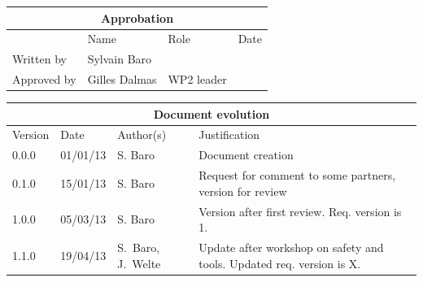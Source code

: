 \documentclass{template/openetcs_article}
\begin{document}
\begin{tabular}{|p{2.2cm}|p{4cm}|p{4cm}|p{2cm}|}
\hline
\multicolumn{4}{|c|}{Approbation} \\
\hline
  &  Name & Role & Date   \\
\hline  
Written by    &  Sylvain Baro &   & \\
\hline
Approved by & Gilles Dalmas & WP2 leader & \\
\hline
\end{tabular}

\begin{tabular}{|p{2.2cm}|p{2cm}|p{3cm}|p{5cm}|}
\hline
\multicolumn{4}{|c|}{Document evolution} \\
\hline
Version &  Date & Author(s) & Justification  \\
\hline  
0.0.0 & 01/01/13 & S. Baro &  Document creation  \\
\hline  
0.1.0 & 15/01/13 & S. Baro &  Request for comment to some partners, version for review  \\
\hline  
1.0.0 & 05/03/13 & S. Baro &  Version after first review. Req. version is 1. \\
\hline
1.1.0 & 19/04/13 & S.~Baro, J.~Welte &  Update after workshop on safety and tools. Updated req. version is X.\\
\hline
\end{tabular}

\newpage

\tableofcontents
\newpage







\newcommand{\docend}{{\begin{center}\large\textbf{<End of Document>}\end{center}}}
\newcommand{\tbd}{\colorbox{cyan}{\%\%To Be Defined\%\%}}
\newcommand{\tbc}{\colorbox{cyan}{\%\%To Be Confirmed\%\%}}
\newcommand{\todo}[1]{\colorbox{cyan}{\%\%{#1}\%\%}}
\newlength{\origindent}

\newenvironment{issue}{
	\begin{quote}
	\begin{itshape}Open Issue. 
}{
	\end{itshape}
	\end{quote}
}
\end{document}
